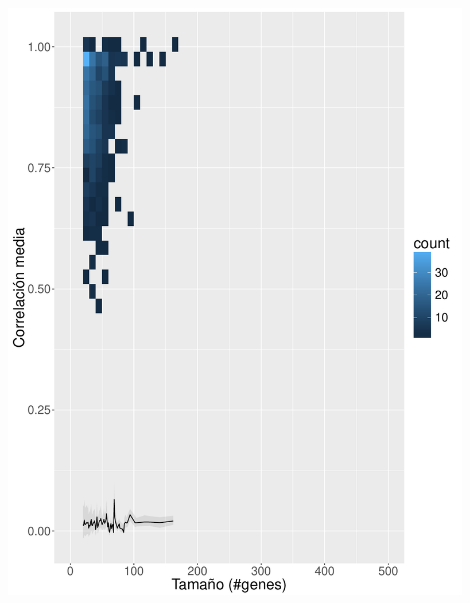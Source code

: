 \documentclass[serif,9pt, t]{beamer}
\begin{document}
\begin{frame}
\begin{columns}[T]
	\includegraphics[width=0.9\textwidth]{correlacion_media_por_tamano_ds_4.pdf}	
\end{columns}
\end{frame}
\end{document}
